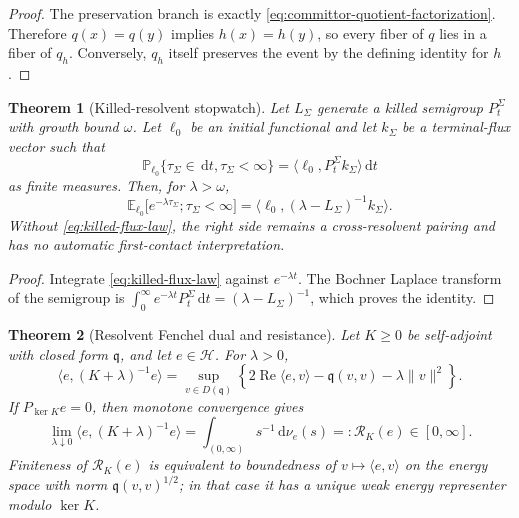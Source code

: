 \documentclass[11pt]{article}
\numberwithin{section}{part}
\theoremstyle{plain}
\newtheorem{theorem}{Theorem}[section]
\theoremstyle{definition}
\theoremstyle{remark}
\newcommand{\dd}{\,\mathrm d}
\newcommand{\Hspace}{\mathcal H}
\begin{document}
\begin{proof}
The preservation branch is exactly
\eqref{eq:committor-quotient-factorization}.  Therefore
\(q(x)=q(y)\) implies \(h(x)=h(y)\), so every fiber of \(q\) lies in a fiber
of \(q_h\).  Conversely, \(q_h\) itself preserves the event by the defining
identity for \(h\).
\end{proof}

\begin{theorem}[Killed-resolvent stopwatch]
\label{thm:killed-resolvent-stopwatch}
Let \(L_\Sigma\) generate a killed semigroup \(P_t^\Sigma\) with growth
bound \(\omega\).  Let \(\ell_0\) be an initial functional and let
\(k_\Sigma\) be a terminal-flux vector such that
\begin{equation}
 \label{eq:killed-flux-law}
 \mathbb P_{\ell_0}\{\tau_\Sigma\in\dd t,\tau_\Sigma<\infty\}
 =\langle\ell_0,P_t^\Sigma k_\Sigma\rangle\dd t
\end{equation}
as finite measures.  Then, for \(\lambda>\omega\),
\begin{equation}
 \label{eq:killed-arrival-resolvent}
 \mathbb E_{\ell_0}
 \bigl[e^{-\lambda\tau_\Sigma};\tau_\Sigma<\infty\bigr]
 =\langle\ell_0,(\lambda-L_\Sigma)^{-1}k_\Sigma\rangle.
\end{equation}
Without \eqref{eq:killed-flux-law}, the right side remains a cross-resolvent
pairing and has no automatic first-contact interpretation.
\end{theorem}

\begin{proof}
Integrate \eqref{eq:killed-flux-law} against \(e^{-\lambda t}\).  The Bochner
Laplace transform of the semigroup is
\(\int_0^\infty e^{-\lambda t}P_t^\Sigma\dd t
=(\lambda-L_\Sigma)^{-1}\), which proves the identity.
\end{proof}

\begin{theorem}[Resolvent Fenchel dual and resistance]
\label{thm:resolvent-resistance}
Let \(K\ge0\) be self-adjoint with closed form \(\mathfrak q\), and let
\(e\in\Hspace\).  For \(\lambda>0\),
\begin{equation}
 \label{eq:resolvent-fenchel}
 \langle e,(K+\lambda)^{-1}e\rangle
 =\sup_{v\in D(\mathfrak q)}
 \left\{2\operatorname{Re}\langle e,v\rangle
 -\mathfrak q(v,v)-\lambda\|v\|^2\right\}.
\end{equation}
If \(P_{\ker K}e=0\), then monotone convergence gives
\begin{equation}
 \label{eq:resistance-limit}
 \lim_{\lambda\downarrow0}\langle e,(K+\lambda)^{-1}e\rangle
 =\int_{(0,\infty)}s^{-1}\dd\nu_e(s)
 =:\mathcal R_K(e)\in[0,\infty].
\end{equation}
Finiteness of \(\mathcal R_K(e)\) is equivalent to boundedness of
\(v\mapsto\langle e,v\rangle\) on the energy space with norm
\(\mathfrak q(v,v)^{1/2}\); in that case it has a unique weak energy
representer modulo \(\ker K\).
\end{theorem}
\end{document}
